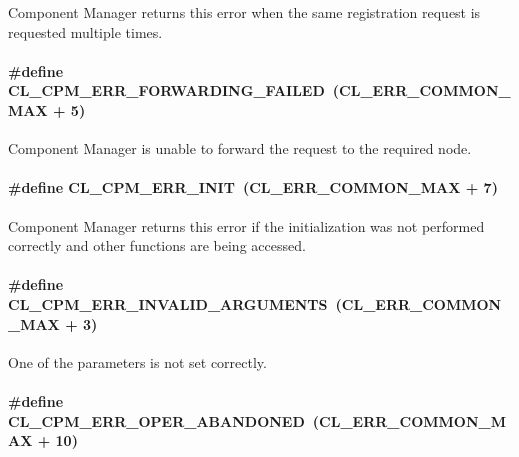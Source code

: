 Component Manager returns this error when the same registration request is requested multiple times. \hypertarget{group__group14_ga71}{
\paragraph[CL\_\-CPM\_\-ERR\_\-FORWARDING\_\-FAILED]{\setlength{\rightskip}{0pt plus 5cm}\#define CL\_\-CPM\_\-ERR\_\-FORWARDING\_\-FAILED~(CL\_\-ERR\_\-COMMON\_\-MAX + 5)}\hfill}
\label{group__group14_ga71}


Component Manager is unable to forward the request to the required node. \hypertarget{group__group14_ga73}{
\paragraph[CL\_\-CPM\_\-ERR\_\-INIT]{\setlength{\rightskip}{0pt plus 5cm}\#define CL\_\-CPM\_\-ERR\_\-INIT~(CL\_\-ERR\_\-COMMON\_\-MAX + 7)}\hfill}
\label{group__group14_ga73}


Component Manager returns this error if the initialization was not performed correctly and other functions are being accessed. \hypertarget{group__group14_ga69}{
\paragraph[CL\_\-CPM\_\-ERR\_\-INVALID\_\-ARGUMENTS]{\setlength{\rightskip}{0pt plus 5cm}\#define CL\_\-CPM\_\-ERR\_\-INVALID\_\-ARGUMENTS~(CL\_\-ERR\_\-COMMON\_\-MAX + 3)}\hfill}
\label{group__group14_ga69}


One of the parameters is not set correctly. \hypertarget{group__group14_ga76}{
\paragraph[CL\_\-CPM\_\-ERR\_\-OPER\_\-ABANDONED]{\setlength{\rightskip}{0pt plus 5cm}\#define CL\_\-CPM\_\-ERR\_\-OPER\_\-ABANDONED~(CL\_\-ERR\_\-COMMON\_\-MAX + 10)}\hfill}
\label{group__group14_ga76}


